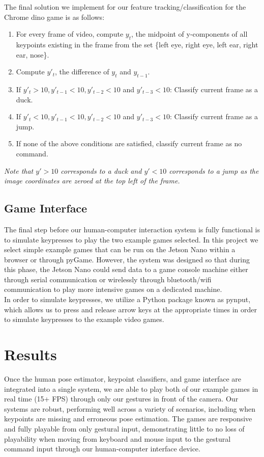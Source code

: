 \documentclass[10pt,twocolumn,letterpaper]{article}
\begin{document}
The final solution we implement for our feature tracking/classification for 
the Chrome dino game is as follows:

\begin{enumerate}
    \item For every frame of video, compute $y_t$, the midpoint of y-components 
    of all keypoints 
        existing in the frame from the set 
        \{left eye, right eye, left ear, right ear, nose\}.
    \item Compute $y'_t$, the difference of $y_t$ and $y_{t-1}$.
    \item If $y'_t > 10, y'_{t-1} < 10, y'_{t-2} < 10$ and $y'_{t-3} < 10$: 
        Classify current frame as a duck.
    \item If $y'_t < 10, y'_{t-1} < 10, y'_{t-2} < 10$ and $y'_{t-3} < 10$:
        Classify current frame as a jump.
    \item If none of the above conditions are satisfied, classify current frame as 
        no command.
\end{enumerate}

\textit{Note that $y' > 10$ corresponds to a duck and $y' < 10$ corresponds 
to a jump as the image coordinates are zeroed at the top left of the frame.}

\subsection{Game Interface}
The final step before our human-computer interaction system is fully functional 
is to simulate keypresses to play the two example games selected. In this project 
we select simple example games that can be run on the Jetson Nano within a browser 
or through pyGame. However, the system was designed so that during this phase, the 
Jetson Nano could send data to a game console machine either through serial 
communication or wirelessly through bluetooth/wifi communication to play more 
intensive games on a dedicated machine.\\

In order to simulate keypresses, we utilize a Python package known as pynput, 
which allows us to press and release arrow keys at the appropriate times in order 
to simulate keypresses to the example video games.

\section{Results}
Once the human pose estimator, keypoint classifiers, and game interface are integrated into 
a single system, we are able to play both of our example games in real time (15+ FPS) through only our 
gestures in front of the camera. Our systems are robust, performing well across a variety of scenarios, 
including when keypoints are missing and erroneous pose estimation. The games are responsive and 
fully playable from only gestural input, demonstrating little to no loss of playability when 
moving from keyboard and mouse input to the gestural command input through our human-computer 
interface device.\\
\end{document}

